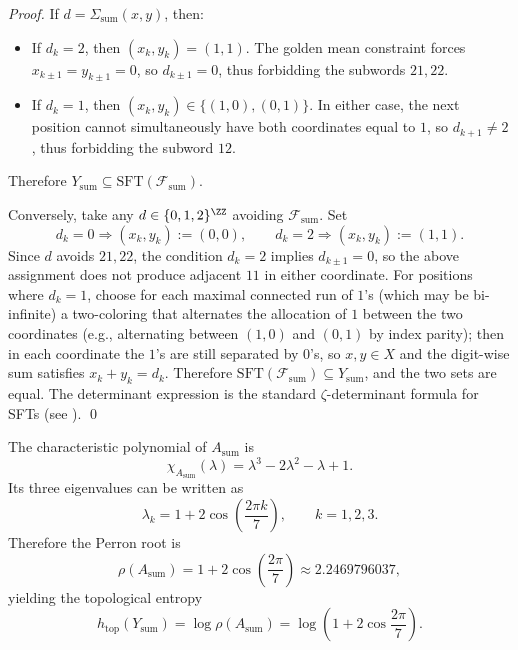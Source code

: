 \begin{proof}
If $d=\Sigma_{\mathrm{sum}}(x,y)$, then:
\begin{itemize}
  \item If $d_k=2$, then $(x_k,y_k)=(1,1)$. The golden mean constraint forces $x_{k\pm 1}=y_{k\pm 1}=0$, so $d_{k\pm 1}=0$, thus forbidding the subwords $21,22$.
  \item If $d_k=1$, then $(x_k,y_k)\in\{(1,0),(0,1)\}$. In either case, the next position cannot simultaneously have both coordinates equal to $1$, so $d_{k+1}\neq 2$, thus forbidding the subword $12$.
\end{itemize}
Therefore $Y_{\mathrm{sum}}\subseteq \mathrm{SFT}(\mathcal{F}_{\mathrm{sum}})$.

Conversely, take any $d\in\{0,1,2\}^{\ZZ}$ avoiding $\mathcal{F}_{\mathrm{sum}}$. Set
\[
d_k=0\Rightarrow (x_k,y_k):=(0,0),\qquad
d_k=2\Rightarrow (x_k,y_k):=(1,1).
\]
Since $d$ avoids $21,22$, the condition $d_k=2$ implies $d_{k\pm1}=0$, so the above assignment does not produce adjacent $11$ in either coordinate.
For positions where $d_k=1$, choose for each maximal connected run of $1$'s (which may be bi-infinite) a two-coloring that alternates the allocation of $1$ between the two coordinates (e.g., alternating between $(1,0)$ and $(0,1)$ by index parity); then in each coordinate the $1$'s are still separated by $0$'s, so $x,y\in X$ and the digit-wise sum satisfies $x_k+y_k=d_k$.
Therefore $\mathrm{SFT}(\mathcal{F}_{\mathrm{sum}})\subseteq Y_{\mathrm{sum}}$, and the two sets are equal.
The determinant expression is the standard $\zeta$-determinant formula for SFTs (see \cite{LindMarcus1995,BrinStuck2002}). \qed
\end{proof}

\begin{proposition}\label{prop:real-input-digitwise-sum-cyclotomic-spectrum}
The characteristic polynomial of $A_{\mathrm{sum}}$ is
\[
\chi_{A_{\mathrm{sum}}}(\lambda)=\lambda^3-2\lambda^2-\lambda+1.
\]
Its three eigenvalues can be written as
\[
\lambda_k=1+2\cos\!\left(\frac{2\pi k}{7}\right),\qquad k=1,2,3.
\]
Therefore the Perron root is
\[
\rho(A_{\mathrm{sum}})=1+2\cos\!\left(\frac{2\pi}{7}\right)\approx 2.2469796037,
\]
yielding the topological entropy
\[
h_{\mathrm{top}}(Y_{\mathrm{sum}})=\log \rho(A_{\mathrm{sum}})=\log\!\left(1+2\cos\frac{2\pi}{7}\right).
\]
\end{proposition}

